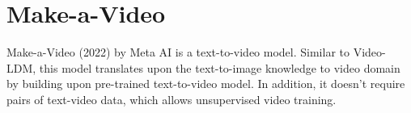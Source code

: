 \section{Make-a-Video}
\label{sec:make_a_video}

Make-a-Video \cite{make_a_video} (2022) by Meta AI is a text-to-video model. Similar to Video-LDM, this model translates upon the text-to-image knowledge to video domain by building upon pre-trained text-to-video model. In addition, it doesn't require pairs of text-video data, which allows unsupervised video training.